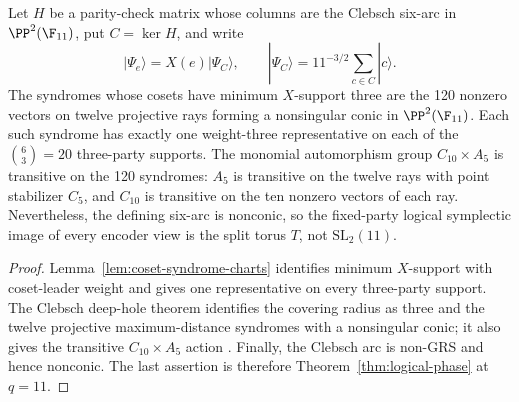 \begin{proposition}
\label{prop:clebsch-x-syndrome}
Let \(H\) be a parity-check matrix whose columns are the Clebsch six-arc
in \(\PP^2(\F_{11})\), put \(C=\ker H\), and write
\[
 |\Psi_e\rangle=X(e)|\Psi_C\rangle,
 \qquad
 |\Psi_C\rangle=11^{-3/2}\sum_{c\in C}|c\rangle .
\]
The syndromes whose cosets have minimum \(X\)-support three are the 120
nonzero vectors on twelve projective rays forming a nonsingular conic in
\(\PP^2(\F_{11})\).  Each such syndrome has exactly one weight-three
representative on each of the \(\binom63=20\) three-party supports.  The
monomial automorphism group
\(C_{10}\times A_5\) is transitive on the 120 syndromes: \(A_5\) is
transitive on the twelve rays with point stabilizer \(C_5\), and
\(C_{10}\) is transitive on the ten nonzero vectors of each ray.
Nevertheless, the defining six-arc is nonconic, so the fixed-party
logical symplectic image of every encoder view is the split torus \(T\),
not \(\mathrm{SL}_2(11)\).
\end{proposition}

\begin{proof}
Lemma~\ref{lem:coset-syndrome-charts} identifies minimum \(X\)-support
with coset-leader weight and gives one representative on every
three-party support.  The Clebsch deep-hole theorem identifies the covering
radius as three and
the twelve projective maximum-distance syndromes with a nonsingular conic;
it also gives the transitive \(C_{10}\times A_5\) action
\cite[Proposition~6.2, Corollary~6.3, and Proposition~6.4]{RuddClebsch2026}.
Finally, the Clebsch arc is non-GRS and
hence nonconic.  The last assertion is therefore
Theorem~\ref{thm:logical-phase} at \(q=11\).
\end{proof}

